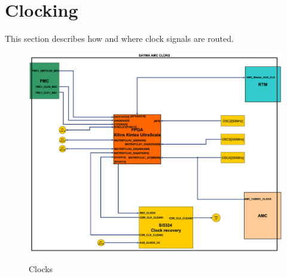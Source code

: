 \section{Clocking}

This section describes how and where clock signals are routed.

	\begin{figure}[htbp!]
		\centering
		\includegraphics[scale=0.2]{img/clk.eps}\\
		\caption{Clocks} \label{clocking}
	\end{figure}


